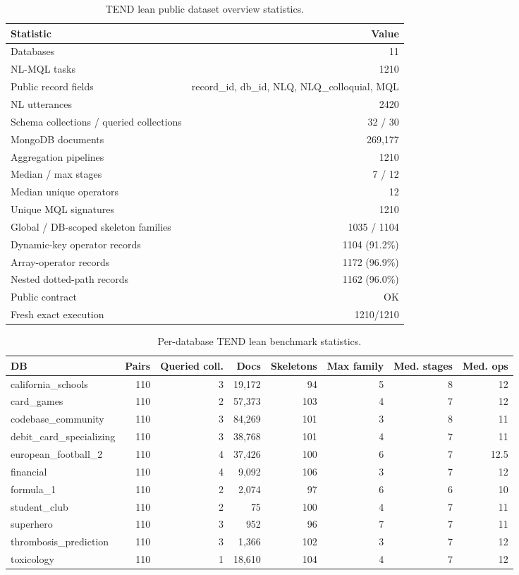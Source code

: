 \begin{table}[t]
\centering
\caption{TEND lean public dataset overview statistics.}
\label{tab:tend-overview}
\begin{tabular}{lr}
\toprule
Statistic & Value \\
\midrule
Databases & 11 \\
NL-MQL tasks & 1210 \\
Public record fields & record\_id, db\_id, NLQ, NLQ\_colloquial, MQL \\
NL utterances & 2420 \\
Schema collections / queried collections & 32 / 30 \\
MongoDB documents & 269,177 \\
Aggregation pipelines & 1210 \\
Median / max stages & 7 / 12 \\
Median unique operators & 12 \\
Unique MQL signatures & 1210 \\
Global / DB-scoped skeleton families & 1035 / 1104 \\
Dynamic-key operator records & 1104 (91.2\%) \\
Array-operator records & 1172 (96.9\%) \\
Nested dotted-path records & 1162 (96.0\%) \\
Public contract & OK \\
Fresh exact execution & 1210/1210 \\
\bottomrule
\end{tabular}
\end{table}

\begin{table}[t]
\centering
\caption{Per-database TEND lean benchmark statistics.}
\label{tab:tend-per-db}
\begin{tabular}{lrrrrrrr}
\toprule
DB & Pairs & Queried coll. & Docs & Skeletons & Max family & Med. stages & Med. ops \\
\midrule
california\_schools & 110 & 3 & 19,172 & 94 & 5 & 8 & 12 \\
card\_games & 110 & 2 & 57,373 & 103 & 4 & 7 & 12 \\
codebase\_community & 110 & 3 & 84,269 & 101 & 3 & 8 & 11 \\
debit\_card\_specializing & 110 & 3 & 38,768 & 101 & 4 & 7 & 11 \\
european\_football\_2 & 110 & 4 & 37,426 & 100 & 6 & 7 & 12.5 \\
financial & 110 & 4 & 9,092 & 106 & 3 & 7 & 12 \\
formula\_1 & 110 & 2 & 2,074 & 97 & 6 & 6 & 10 \\
student\_club & 110 & 2 & 75 & 100 & 4 & 7 & 11 \\
superhero & 110 & 3 & 952 & 96 & 7 & 7 & 11 \\
thrombosis\_prediction & 110 & 3 & 1,366 & 102 & 3 & 7 & 12 \\
toxicology & 110 & 1 & 18,610 & 104 & 4 & 7 & 12 \\
\bottomrule
\end{tabular}
\end{table}
